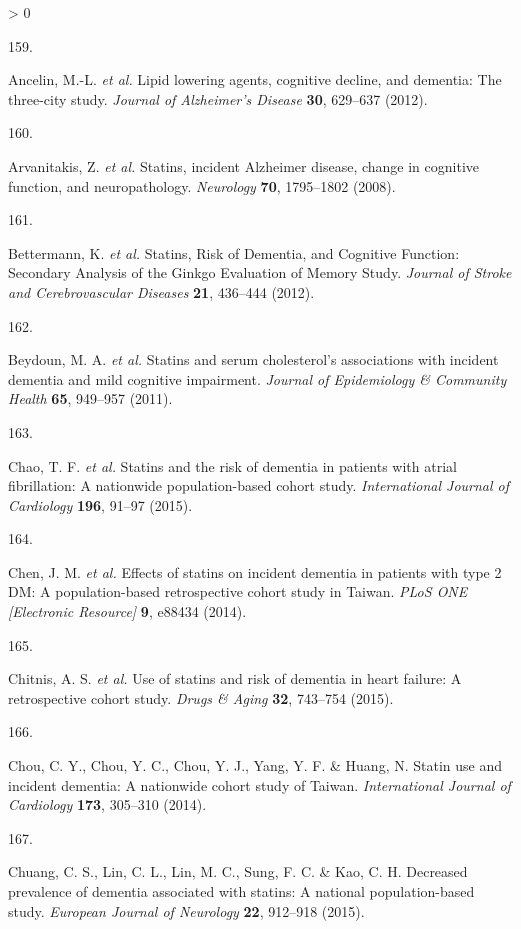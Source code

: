 \documentclass[a4paper, twoside]{templates/ociamthesis}
\newlength{\cslhangindent}
\newlength{\csllabelwidth}
\newenvironment{CSLReferences}[3] %
 {%
  \setlength{\parindent}{0pt}
  \ifodd #1 \everypar{\setlength{\hangindent}{\cslhangindent}}\ignorespaces\fi
  \ifnum #2 > 0
  \setlength{\parskip}{#2\baselineskip}
  \fi
 }%
 {}
\newcommand{\CSLLeftMargin}[1]{\parbox[t]{\maxof{\widthof{#1}}{\csllabelwidth}}{#1}}
\newcommand{\CSLRightInline}[1]{\parbox[t]{\linewidth - \csllabelwidth}{#1}}
\begin{document}
\begin{CSLReferences}{0}{0}
\leavevmode\hypertarget{ref-ancelin2012}{}%
\CSLLeftMargin{159. }
\CSLRightInline{Ancelin, M.-L. \emph{et al.} Lipid lowering agents, cognitive decline, and dementia: The three-city study. \emph{Journal of Alzheimer's Disease} \textbf{30}, 629--637 (2012).}

\leavevmode\hypertarget{ref-arvanitakis2008}{}%
\CSLLeftMargin{160. }
\CSLRightInline{Arvanitakis, Z. \emph{et al.} Statins, incident {Alzheimer} disease, change in cognitive function, and neuropathology. \emph{Neurology} \textbf{70}, 1795--1802 (2008).}

\leavevmode\hypertarget{ref-bettermann2012}{}%
\CSLLeftMargin{161. }
\CSLRightInline{Bettermann, K. \emph{et al.} Statins, {Risk} of {Dementia}, and {Cognitive Function}: Secondary {Analysis} of the {Ginkgo Evaluation} of {Memory Study}. \emph{Journal of Stroke and Cerebrovascular Diseases} \textbf{21}, 436--444 (2012).}

\leavevmode\hypertarget{ref-beydoun2011}{}%
\CSLLeftMargin{162. }
\CSLRightInline{Beydoun, M. A. \emph{et al.} Statins and serum cholesterol's associations with incident dementia and mild cognitive impairment. \emph{Journal of Epidemiology \& Community Health} \textbf{65}, 949--957 (2011).}

\leavevmode\hypertarget{ref-chao2015a}{}%
\CSLLeftMargin{163. }
\CSLRightInline{Chao, T. F. \emph{et al.} Statins and the risk of dementia in patients with atrial fibrillation: A nationwide population-based cohort study. \emph{International Journal of Cardiology} \textbf{196}, 91--97 (2015).}

\leavevmode\hypertarget{ref-chen2014}{}%
\CSLLeftMargin{164. }
\CSLRightInline{Chen, J. M. \emph{et al.} Effects of statins on incident dementia in patients with type 2 {DM}: A population-based retrospective cohort study in {Taiwan}. \emph{PLoS ONE {[}Electronic Resource{]}} \textbf{9}, e88434 (2014).}

\leavevmode\hypertarget{ref-chitnis2015}{}%
\CSLLeftMargin{165. }
\CSLRightInline{Chitnis, A. S. \emph{et al.} Use of statins and risk of dementia in heart failure: A retrospective cohort study. \emph{Drugs \& Aging} \textbf{32}, 743--754 (2015).}

\leavevmode\hypertarget{ref-chou2014a}{}%
\CSLLeftMargin{166. }
\CSLRightInline{Chou, C. Y., Chou, Y. C., Chou, Y. J., Yang, Y. F. \& Huang, N. Statin use and incident dementia: A nationwide cohort study of {Taiwan}. \emph{International Journal of Cardiology} \textbf{173}, 305--310 (2014).}

\leavevmode\hypertarget{ref-chuang2015}{}%
\CSLLeftMargin{167. }
\CSLRightInline{Chuang, C. S., Lin, C. L., Lin, M. C., Sung, F. C. \& Kao, C. H. Decreased prevalence of dementia associated with statins: A national population-based study. \emph{European Journal of Neurology} \textbf{22}, 912--918 (2015).}


\end{CSLReferences}
\end{document}
